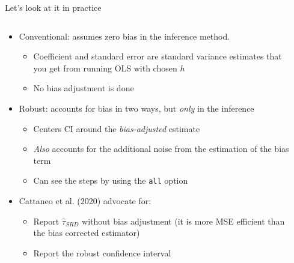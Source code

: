 \documentclass[notes,11pt, aspectratio=169]{beamer}
\begin{document}
\begin{frame}{Let's look at it in practice}
    \begin{columns}[onlytextwidth, T] %
      \begin{column}{.6\textwidth}
        \begin{itemize}
        \item Conventional: assumes zero bias in the inference method.
          \begin{itemize}
          \item Coefficient and standard error are standard variance
            estimates that you get from running OLS with chosen $h$
          \item No bias adjustment is done
          \end{itemize}
        \item Robust: accounts for bias in two ways, but \emph{only} in the inference
          \begin{itemize}
          \item Centers CI around the \emph{bias-adjusted} estimate
          \item \emph{Also} accounts for the additional noise from the estimation of the bias term
          \item Can see the steps by using the \texttt{all} option            
          \end{itemize}
        \item<2-> Cattaneo et al. (2020) advocate for:
          \begin{itemize}
          \item Report $\hat{\tau}_{SRD}$ without bias adjustment (it
            is more MSE efficient than the bias corrected estimator)
          \item Report the robust confidence interval
          \end{itemize}
        \end{itemize}
      \end{column}%
      \hfill%
      \begin{column}{.4\textwidth}
      \end{column}%
    \end{columns}
\end{frame}
\end{document}
